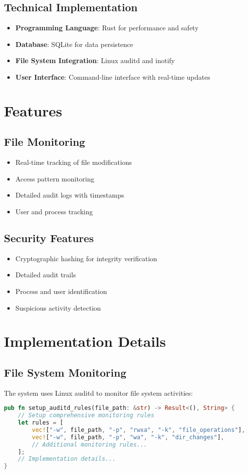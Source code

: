 \documentclass[12pt]{article}
\begin{document}
\subsection{Technical Implementation}
\begin{itemize}
    \item \textbf{Programming Language}: Rust for performance and safety
    \item \textbf{Database}: SQLite for data persistence
    \item \textbf{File System Integration}: Linux auditd and inotify
    \item \textbf{User Interface}: Command-line interface with real-time updates
\end{itemize}

\section{Features}
\subsection{File Monitoring}
\begin{itemize}
    \item Real-time tracking of file modifications
    \item Access pattern monitoring
    \item Detailed audit logs with timestamps
    \item User and process tracking
\end{itemize}

\subsection{Security Features}
\begin{itemize}
    \item Cryptographic hashing for integrity verification
    \item Detailed audit trails
    \item Process and user identification
    \item Suspicious activity detection
\end{itemize}

\section{Implementation Details}
\subsection{File System Monitoring}
The system uses Linux auditd to monitor file system activities:
\begin{lstlisting}[language=Rust]
pub fn setup_auditd_rules(file_path: &str) -> Result<(), String> {
    // Setup comprehensive monitoring rules
    let rules = [
        vec!["-w", file_path, "-p", "rwxa", "-k", "file_operations"],
        vec!["-w", file_path, "-p", "wa", "-k", "dir_changes"],
        // Additional monitoring rules...
    ];
    // Implementation details...
}
\end{lstlisting}
\end{document}
